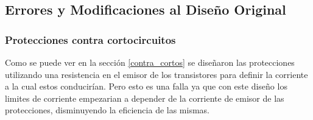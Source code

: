 \subsection{Errores y Modificaciones al Diseño Original}
\bigskip
\subsubsection{Protecciones contra cortocircuitos}
\medskip
Como se puede ver en la sección \ref{contra_cortos} se diseñaron las protecciones utilizando una resistencia en el emisor de los transistores para definir la corriente a la cual estos conducirían. Pero esto es una falla ya que con este diseño los limites de corriente empezarian a depender de la corriente de emisor de las protecciones, disminuyendo la eficiencia de las mismas. 